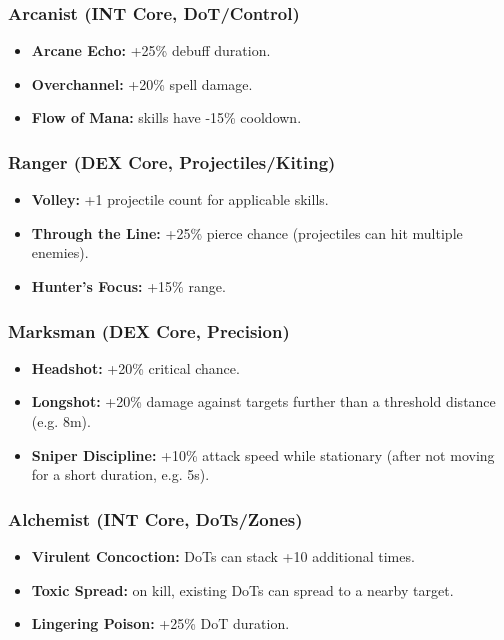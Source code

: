 \subsubsection*{Arcanist (INT Core, DoT/Control)}

\begin{itemize}
	\item \textbf{Arcane Echo:} +25\% debuff duration.
	\item \textbf{Overchannel:} +20\% spell damage.
	\item \textbf{Flow of Mana:} skills have -15\% cooldown.
\end{itemize}

\subsubsection*{Ranger (DEX Core, Projectiles/Kiting)}

\begin{itemize}
	\item \textbf{Volley:} +1 projectile count for applicable skills.
	\item \textbf{Through the Line:} +25\% pierce chance (projectiles can hit multiple enemies).
	\item \textbf{Hunter’s Focus:} +15\% range.
\end{itemize}

\subsubsection*{Marksman (DEX Core, Precision)}

\begin{itemize}
	\item \textbf{Headshot:} +20\% critical chance.
	\item \textbf{Longshot:} +20\% damage against targets further than a threshold distance (e.g. 8m).
	\item \textbf{Sniper Discipline:} +10\% attack speed while stationary (after not moving for a short duration, e.g. 5s).
\end{itemize}

\subsubsection*{Alchemist (INT Core, DoTs/Zones)}

\begin{itemize}
	\item \textbf{Virulent Concoction:} DoTs can stack +10 additional times.
	\item \textbf{Toxic Spread:} on kill, existing DoTs can spread to a nearby target.
	\item \textbf{Lingering Poison:} +25\% DoT duration.
\end{itemize}

